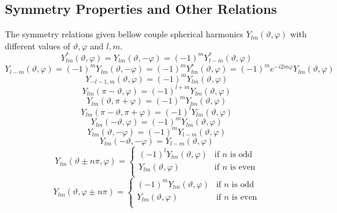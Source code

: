 \subsection{Symmetry Properties and Other Relations}
\par{The symmetry relations given bellow couple spherical harmonics
  $Y_{lm}(\vartheta,\varphi)$ with different values of $\vartheta,\varphi$ and
  $l,m$.}
\begin{equation}
Y_{lm}^{*}(\vartheta,\varphi)=Y_{lm}(\vartheta,-\varphi)=(-1)^mY_{l-m}^{*}(\vartheta,\varphi)
\end{equation}
\begin{equation}
Y_{l-m}(\vartheta,\varphi)=(-1)^mY_{lm}(\vartheta,-\varphi)=(-1)^mY_{lm}^{*}(\vartheta,\varphi)=(-1)^me^{-i2m\varphi}Y_{lm}(\vartheta,\varphi)
\end{equation}
\begin{equation}
Y_{-l-1,m}(\vartheta,\varphi)=(-1)^mY_{lm}(\vartheta,\varphi)
\end{equation}
\begin{equation}
Y_{lm}(\pi-\vartheta,\varphi)=(-1)^{l+m}Y_{lm}(\vartheta,\varphi)
\end{equation}
\begin{equation}
Y_{lm}(\vartheta,\pi+\varphi)=(-1)^mY_{lm}(\vartheta,\varphi)
\end{equation}
\begin{equation}
Y_{lm}(\pi-\vartheta,\pi+\varphi)=(-1)^lY_{lm}(\vartheta,\varphi)
\end{equation}
\begin{equation}
Y_{lm}(-\vartheta,\varphi)=(-1)^mY_{lm}(\vartheta,\varphi)
\end{equation}
\begin{equation}
Y_{lm}(\vartheta,-\varphi)=(-1)^mY_{l-m}(\vartheta,\varphi)
\end{equation}
\begin{equation}
Y_{lm}(-\vartheta,-\varphi)=Y_{l-m}(\vartheta,\varphi)
\end{equation}
\begin{equation}
Y_{lm}(\vartheta \pm n\pi,\varphi)=\left\{ \begin{array}{lc}
(-1)^lY_{lm}(\vartheta,\varphi) & \text{if }n \text{ is odd}\\
Y_{lm}(\vartheta,\varphi) & \text{if }n \text{ is even}\\
\end{array}
\right.
\end{equation}
\begin{equation}
Y_{lm}(\vartheta,\varphi \pm n\pi)=\left\{ \begin{array}{lc}
(-1)^mY_{lm}(\vartheta,\varphi) & \text{if }n \text{ is odd}\\
Y_{lm}(\vartheta,\varphi) & \text{if }n \text{ is even}\\
\end{array}
\right.
\end{equation}
